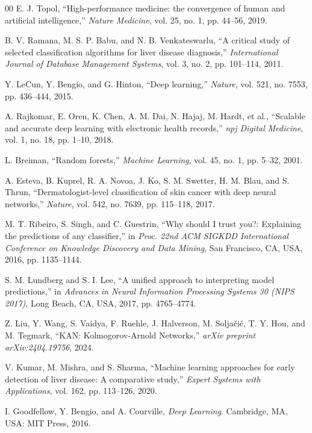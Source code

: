 \documentclass[conference]{IEEEtran}
\begin{document}
\begin{thebibliography}{00}
 E. J. Topol, ``High-performance medicine: the convergence of human and artificial intelligence,'' \textit{Nature Medicine}, vol. 25, no. 1, pp. 44--56, 2019.

 B. V. Ramana, M. S. P. Babu, and N. B. Venkateswarlu, ``A critical study of selected classification algorithms for liver disease diagnosis,'' \textit{International Journal of Database Management Systems}, vol. 3, no. 2, pp. 101--114, 2011.

 Y. LeCun, Y. Bengio, and G. Hinton, ``Deep learning,'' \textit{Nature}, vol. 521, no. 7553, pp. 436--444, 2015.

 A. Rajkomar, E. Oren, K. Chen, A. M. Dai, N. Hajaj, M. Hardt, et al., ``Scalable and accurate deep learning with electronic health records,'' \textit{npj Digital Medicine}, vol. 1, no. 18, pp. 1--10, 2018.

 L. Breiman, ``Random forests,'' \textit{Machine Learning}, vol. 45, no. 1, pp. 5--32, 2001.

 A. Esteva, B. Kuprel, R. A. Novoa, J. Ko, S. M. Swetter, H. M. Blau, and S. Thrun, ``Dermatologist-level classification of skin cancer with deep neural networks,'' \textit{Nature}, vol. 542, no. 7639, pp. 115--118, 2017.

 M. T. Ribeiro, S. Singh, and C. Guestrin, ``Why should I trust you?: Explaining the predictions of any classifier,'' in \textit{Proc. 22nd ACM SIGKDD International Conference on Knowledge Discovery and Data Mining}, San Francisco, CA, USA, 2016, pp. 1135--1144.

 S. M. Lundberg and S. I. Lee, ``A unified approach to interpreting model predictions,'' in \textit{Advances in Neural Information Processing Systems 30 (NIPS 2017)}, Long Beach, CA, USA, 2017, pp. 4765--4774.

 Z. Liu, Y. Wang, S. Vaidya, F. Ruehle, J. Halverson, M. Soljačić, T. Y. Hou, and M. Tegmark, ``KAN: Kolmogorov-Arnold Networks,'' \textit{arXiv preprint arXiv:2404.19756}, 2024.

 V. Kumar, M. Mishra, and S. Sharma, ``Machine learning approaches for early detection of liver disease: A comparative study,'' \textit{Expert Systems with Applications}, vol. 162, pp. 113--126, 2020.

 I. Goodfellow, Y. Bengio, and A. Courville, \textit{Deep Learning}. Cambridge, MA, USA: MIT Press, 2016.


\end{thebibliography}
\end{document}
